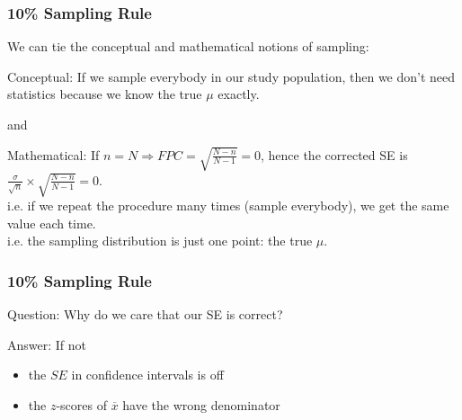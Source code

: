 \documentclass[handout]{beamer}
\newcommand{\blue}[1]{\textcolor{blue2}{#1}}
\newcommand{\xbar}{\overline{x}}
\begin{document}
\begin{frame}[fragile]
\frametitle{10\% Sampling Rule}
We can tie the \blue{conceptual} and \blue{mathematical} notions of sampling:  

\vspace{0.25cm}
\pause
\blue{Conceptual}:  If we sample everybody in our study population, then we don't need statistics because we know the true $\mu$ exactly.
\begin{center}
\pause and
\end{center}
\blue{Mathematical}:  If $n=N \Rightarrow FPC = \sqrt{\frac{N-n}{N-1}} = 0$, hence the \blue{corrected} SE is $\frac{\sigma}{\sqrt{n}}\times\sqrt{\frac{N-n}{N-1}} = 0$.\\
\vspace{0.25cm}
\pause
i.e. if we repeat the procedure many times (sample everybody), we get the same value each time.\\
\vspace{0.25cm}
\pause
i.e. the sampling distribution is just one point: the true $\mu$.\\

\end{frame}


\begin{frame}[fragile]
\frametitle{10\% Sampling Rule}
\blue{Question}:  Why do we care that our SE is correct?

\pause\vspace{0.5cm}

\blue{Answer}:  If not
\begin{itemize}
\item the $SE$ in confidence intervals is off
\item the $z$-scores of $\xbar$ have the wrong denominator
\end{itemize}

\end{frame}


%
%
\end{document}
